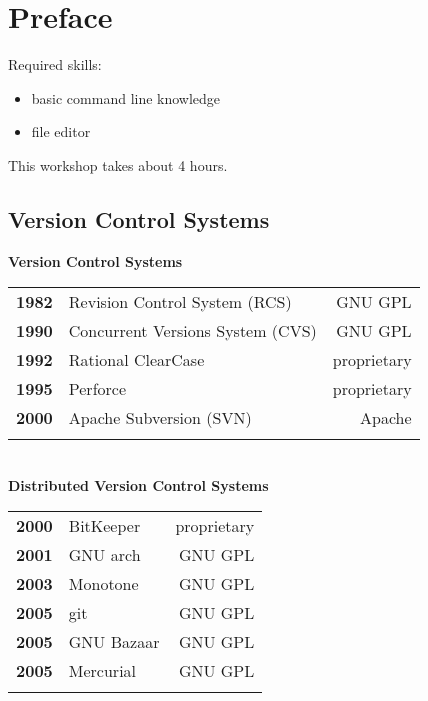 \section{Preface}
\begin{frame}
  \slidetitle

  Required skills:
  \begin{itemize}
    \item basic command line knowledge
    \item file editor
  \end{itemize}
  \vspace{1em}
  This workshop takes about 4 hours.
\end{frame}

\subsection{Version Control Systems}
\begin{frame}
  \subslidetitle

  \textbf{Version Control Systems}
  \pause
  \\
  \begin{tabular}{lp{5cm}r}
    \textbf{1982} & Revision Control System (RCS) & GNU GPL \\
    \pause
    \textbf{1990} & Concurrent Versions System (CVS) & GNU GPL \\
    \pause
    \textbf{1992} & Rational ClearCase & proprietary \\
    \pause
    \textbf{1995} & Perforce  & proprietary \\
    \pause
    \textbf{2000} & Apache Subversion (SVN)  & Apache \\
    \pause
  \end{tabular}
  \\
  \textbf{Distributed Version Control Systems}
  \pause
  \\
  \begin{tabular}{lp{5cm}r}
    \textbf{2000} & BitKeeper  & proprietary \\
    \pause
    \textbf{2001} & GNU arch   & GNU GPL \\
    \pause
    \textbf{2003} & Monotone   & GNU GPL \\
    \pause
    \textbf{2005} & git & GNU GPL \\
    \pause
    \textbf{2005} & GNU Bazaar & GNU GPL \\
    \pause
    \textbf{2005} & Mercurial  & GNU GPL \\
    \pause
  \end{tabular}

\end{frame}

